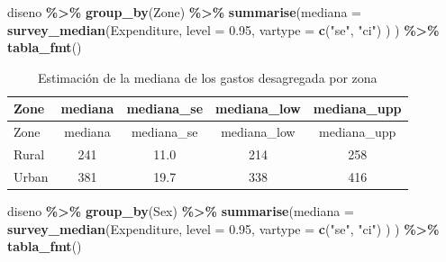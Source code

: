 \documentclass[
  spanish,
  12pt,
]{book}
\newenvironment{Shaded}{\begin{snugshade}}{\end{snugshade}}
\newcommand{\AttributeTok}[1]{\textcolor[rgb]{0.13,0.29,0.53}{#1}}
\newcommand{\FloatTok}[1]{\textcolor[rgb]{0.00,0.00,0.81}{#1}}
\newcommand{\FunctionTok}[1]{\textcolor[rgb]{0.13,0.29,0.53}{\textbf{#1}}}
\newcommand{\NormalTok}[1]{#1}
\newcommand{\SpecialCharTok}[1]{\textcolor[rgb]{0.81,0.36,0.00}{\textbf{#1}}}
\newcommand{\StringTok}[1]{\textcolor[rgb]{0.31,0.60,0.02}{#1}}
\begin{document}
\begin{Shaded}
\begin{Highlighting}[]
\NormalTok{diseno }\SpecialCharTok{\%\textgreater{}\%} 
  \FunctionTok{group\_by}\NormalTok{(Zone) }\SpecialCharTok{\%\textgreater{}\%}
  \FunctionTok{summarise}\NormalTok{(}\AttributeTok{mediana =} \FunctionTok{survey\_median}\NormalTok{(Expenditure,}
                                    \AttributeTok{level =} \FloatTok{0.95}\NormalTok{,}
                                    \AttributeTok{vartype =}  \FunctionTok{c}\NormalTok{(}\StringTok{"se"}\NormalTok{, }\StringTok{"ci"}\NormalTok{)}
\NormalTok{                                    )}
\NormalTok{            ) }\SpecialCharTok{\%\textgreater{}\%}
  \FunctionTok{tabla\_fmt}\NormalTok{()}
\end{Highlighting}
\end{Shaded}

\begin{longtable}[]{@{}lcccc@{}}
\caption{\label{tab:tab-mediana-gasto-zona}Estimación de la mediana de los gastos desagregada por zona}\tabularnewline
\toprule\noalign{}
Zone & mediana & mediana\_se & mediana\_low & mediana\_upp \\
\midrule\noalign{}
\endfirsthead
\toprule\noalign{}
Zone & mediana & mediana\_se & mediana\_low & mediana\_upp \\
\midrule\noalign{}
\endhead
\bottomrule\noalign{}
\endlastfoot
Rural & 241 & 11.0 & 214 & 258 \\
Urban & 381 & 19.7 & 338 & 416 \\
\end{longtable}

\begin{Shaded}
\begin{Highlighting}[]
\NormalTok{diseno }\SpecialCharTok{\%\textgreater{}\%} 
  \FunctionTok{group\_by}\NormalTok{(Sex) }\SpecialCharTok{\%\textgreater{}\%}
  \FunctionTok{summarise}\NormalTok{(}\AttributeTok{mediana =} \FunctionTok{survey\_median}\NormalTok{(Expenditure,}
                                    \AttributeTok{level =} \FloatTok{0.95}\NormalTok{,}
                                    \AttributeTok{vartype =}  \FunctionTok{c}\NormalTok{(}\StringTok{"se"}\NormalTok{, }\StringTok{"ci"}\NormalTok{)}
\NormalTok{                                    )}
\NormalTok{            ) }\SpecialCharTok{\%\textgreater{}\%}
  \FunctionTok{tabla\_fmt}\NormalTok{()}
\end{Highlighting}
\end{Shaded}
\end{document}
